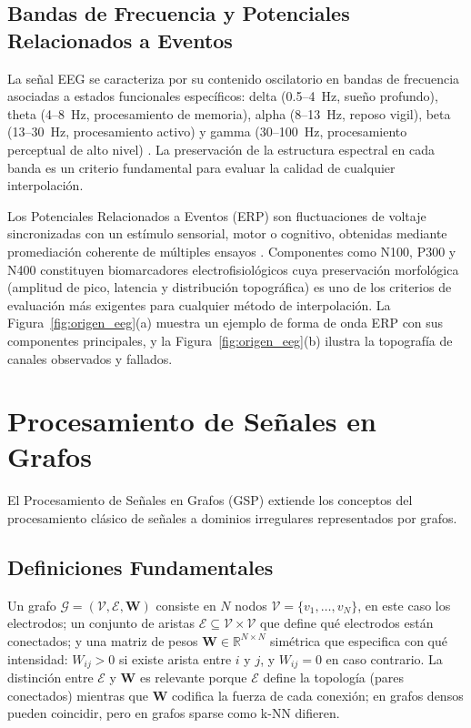 \subsection{Bandas de Frecuencia y Potenciales Relacionados a Eventos}
La señal EEG se caracteriza por su contenido oscilatorio en bandas de frecuencia asociadas a estados funcionales específicos: delta (0.5--4~Hz, sueño profundo), theta (4--8~Hz, procesamiento de memoria), alpha (8--13~Hz, reposo vigil), beta (13--30~Hz, procesamiento activo) y gamma (30--100~Hz, procesamiento perceptual de alto nivel) \cite{buzsaki2006rhythms}. La preservación de la estructura espectral en cada banda es un criterio fundamental para evaluar la calidad de cualquier interpolación.

Los Potenciales Relacionados a Eventos (ERP) son fluctuaciones de voltaje sincronizadas con un estímulo sensorial, motor o cognitivo, obtenidas mediante promediación coherente de múltiples ensayos \cite{luck2014introduction}. Componentes como N100, P300 y N400 constituyen biomarcadores electrofisiológicos cuya preservación morfológica (amplitud de pico, latencia y distribución topográfica) es uno de los criterios de evaluación más exigentes para cualquier método de interpolación. La Figura~\ref{fig:origen_eeg}(a) muestra un ejemplo de forma de onda ERP con sus componentes principales, y la Figura~\ref{fig:origen_eeg}(b) ilustra la topografía de canales observados y fallados.

\section{Procesamiento de Señales en Grafos}

El Procesamiento de Señales en Grafos (GSP) \cite{shuman2013,ortega2018} extiende los conceptos del procesamiento clásico de señales a dominios irregulares representados por grafos.

\subsection{Definiciones Fundamentales}

Un grafo $\mathcal{G} = (\mathcal{V}, \mathcal{E}, \mathbf{W})$ consiste en $N$ nodos $\mathcal{V} = \{v_1, \dots, v_N\}$, en este caso los electrodos; un conjunto de aristas $\mathcal{E} \subseteq \mathcal{V} \times \mathcal{V}$ que define qué electrodos están conectados; y una matriz de pesos $\mathbf{W} \in \mathbb{R}^{N \times N}$ simétrica que especifica con qué intensidad: $W_{ij} > 0$ si existe arista entre $i$ y $j$, y $W_{ij} = 0$ en caso contrario. La distinción entre $\mathcal{E}$ y $\mathbf{W}$ es relevante porque $\mathcal{E}$ define la topología (pares conectados) mientras que $\mathbf{W}$ codifica la fuerza de cada conexión; en grafos densos pueden coincidir, pero en grafos sparse como k-NN difieren.

